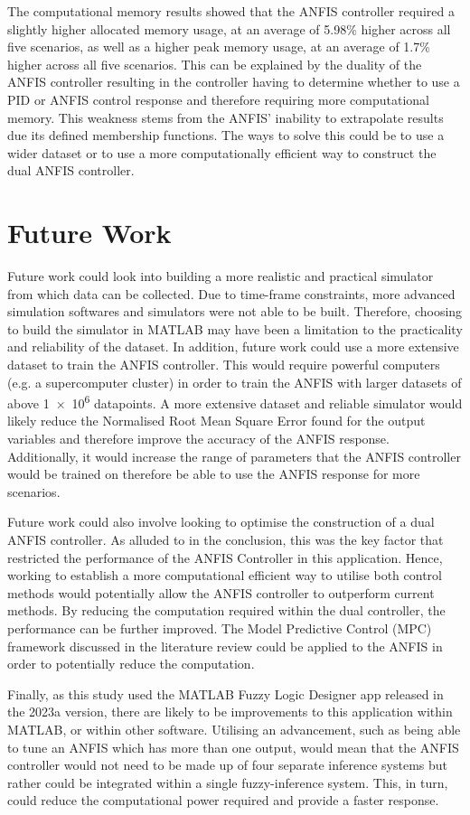 The computational memory results showed that the ANFIS controller required a slightly higher allocated memory usage, at an average of 5.98\% higher across all five scenarios, as well as a higher peak memory usage, at an average of 1.7\% higher across all five scenarios. This can be explained by the duality of the ANFIS controller resulting in the controller having to determine whether to use a PID or ANFIS control response and therefore requiring more computational memory. This weakness stems from the ANFIS' inability to extrapolate results due its defined membership functions. The ways to solve this could be to use a wider dataset or to use a more computationally efficient way to construct the dual ANFIS controller. 
\section{Future Work} 
Future work could look into building a more realistic and practical simulator from which data can be collected. Due to time-frame constraints, more advanced simulation softwares and simulators were not able to be built. Therefore, choosing to build the simulator in MATLAB may have been a limitation to the practicality and reliability of the dataset. In addition, future work could use a more extensive dataset to train the ANFIS controller. This would require powerful computers (e.g. a supercomputer cluster) in order to train the ANFIS with larger datasets of above \SI{1e6}{} datapoints. A more extensive dataset and reliable simulator would likely reduce the Normalised Root Mean Square Error found for the output variables and therefore improve the accuracy of the ANFIS response. Additionally, it would increase the range of parameters that the ANFIS controller would be trained on therefore be able to use the ANFIS response for more scenarios. 

Future work could also involve looking to optimise the construction of a dual ANFIS controller. As alluded to in the conclusion, this was the key factor that restricted the performance of the ANFIS Controller in this application. Hence, working to establish a more computational efficient way to utilise both control methods would potentially allow the ANFIS controller to outperform current methods. By reducing the computation required within the dual controller, the performance can be further improved. The Model Predictive Control (MPC) framework discussed in the literature review could be applied to the ANFIS in order to potentially reduce the computation. 

Finally, as this study used the MATLAB Fuzzy Logic Designer app released in the 2023a version, there are likely to be improvements to this application within MATLAB, or within other software. Utilising an advancement, such as being able to tune an ANFIS which has more than one output, would mean that the ANFIS controller would not need to be made up of four separate inference systems but rather could be integrated within a single fuzzy-inference system. This, in turn, could reduce the computational power required and provide a faster response. 
